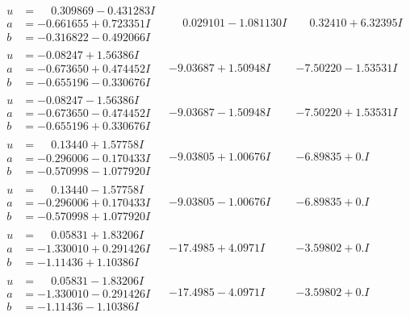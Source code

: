 \documentclass[1p]{elsarticle_modified}
\theoremstyle{definition}
\begin{document}
$$\begin{array}{c|c|c}
\begin{aligned}
u &= \phantom{-}0.309869 - 0.431283 I \\
a &= -0.661655 + 0.723351 I \\
b &= -0.316822 - 0.492066 I\end{aligned}
 & \phantom{-}0.029101 - 1.081130 I & \phantom{-}0.32410 + 6.32395 I \\ \hline\begin{aligned}
u &= -0.08247 + 1.56386 I \\
a &= -0.673650 + 0.474452 I \\
b &= -0.655196 - 0.330676 I\end{aligned}
 & -9.03687 + 1.50948 I & -7.50220 - 1.53531 I \\ \hline\begin{aligned}
u &= -0.08247 - 1.56386 I \\
a &= -0.673650 - 0.474452 I \\
b &= -0.655196 + 0.330676 I\end{aligned}
 & -9.03687 - 1.50948 I & -7.50220 + 1.53531 I \\ \hline\begin{aligned}
u &= \phantom{-}0.13440 + 1.57758 I \\
a &= -0.296006 - 0.170433 I \\
b &= -0.570998 - 1.077920 I\end{aligned}
 & -9.03805 + 1.00676 I & -6.89835 + 0. I\phantom{ +0.000000I} \\ \hline\begin{aligned}
u &= \phantom{-}0.13440 - 1.57758 I \\
a &= -0.296006 + 0.170433 I \\
b &= -0.570998 + 1.077920 I\end{aligned}
 & -9.03805 - 1.00676 I & -6.89835 + 0. I\phantom{ +0.000000I} \\ \hline\begin{aligned}
u &= \phantom{-}0.05831 + 1.83206 I \\
a &= -1.330010 + 0.291426 I \\
b &= -1.11436 + 1.10386 I\end{aligned}
 & -17.4985 + 4.0971 I & -3.59802 + 0. I\phantom{ +0.000000I} \\ \hline\begin{aligned}
u &= \phantom{-}0.05831 - 1.83206 I \\
a &= -1.330010 - 0.291426 I \\
b &= -1.11436 - 1.10386 I\end{aligned}
 & -17.4985 - 4.0971 I & -3.59802 + 0. I\phantom{ +0.000000I} \\ \hline\begin{aligned}

\end{aligned}
\end{array}$$
\end{document}
